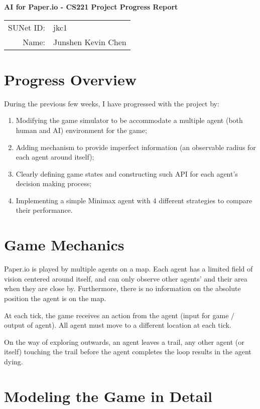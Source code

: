 \documentclass[10pt]{article}
\begin{document}
\begin{center}
{\Large \textbf{AI for Paper.io - CS221 Project Progress Report}}

\begin{tabular}{rl}
SUNet ID: & jkc1 \\
Name: & Junshen Kevin Chen \\
\end{tabular}
\end{center}

\section*{Progress Overview}

During the previous few weeks, I have progressed with the project by:

\begin{enumerate}
    \item Modifying the game simulator to be accommodate a multiple agent (both human and AI) environment for the game;
    \item Adding mechanism to provide imperfect information (an observable radius for each agent around itself);
    \item Clearly defining game states and constructing such API for each agent's decision making process;
    \item Implementing a simple Minimax agent with 4 different strategies to compare their performance.
\end{enumerate}

\section{Game Mechanics}

Paper.io is played by multiple agents on a map. Each agent has a limited field of vision centered around itself, and can only observe other agents' and their area when they are close by. Furthermore, there is no information on the absolute position the agent is on the map.

At each tick, the game receives an action from the agent (input for game / output of agent). All agent must move to a different location at each tick.

On the way of exploring outwards, an agent leaves a trail, any other agent (or itself) touching the trail before the agent completes the loop results in the agent dying. 


\section{Modeling the Game in Detail}
\end{document}
